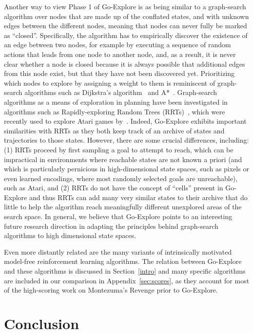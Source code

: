 \documentclass{article}
\begin{document}
Another way to view Phase 1 of Go-Explore is as being similar to a graph-search algorithm over nodes that are made up of the conflated states, and with unknown edges between the different nodes, meaning that nodes can never fully be marked as ``closed''. Specifically, the algorithm has to empirically discover the existence of an edge between two nodes, for example by executing a sequence of random actions that leads from one node to another node, and, as a result, it is never clear whether a node is closed because it is always possible that additional edges from this node exist, but that they have not been discovered yet. Prioritizing which nodes to explore by assigning a weight to them is reminiscent of graph-search algorithms such as Dijkstra's algorithm~\cite{Dijkstra:1959:NTP:2722880.2722945} and A*~\cite{Hart:astar}. Graph-search algorithms as a means of exploration in planning have been investigated in algorithms such as Rapidly-exploring Random Trees (RRTs)~\cite{LaValle1998RapidlyExploringRT}, which were recently used to explore Atari games by~\citet{zhan2018taking}. Indeed, Go-Explore exhibits important similarities with RRTs as they both keep track of an archive of states and trajectories to those states. However, there are some crucial differences, including: (1) RRTs proceed by first sampling a goal to attempt to reach, which can be impractical in environments where reachable states are not known a priori (and which is particularly pernicious in high-dimensional state spaces, such as pixels or even learned encodings, where most randomly selected goals are unreachable), such as Atari, and (2) RRTs do not have the concept of ``cells'' present in Go-Explore and thus RRTs can add many very similar states to their archive that do little to help the algorithm reach meaningfully different unexplored areas of the search space.
In general, we believe that Go-Explore points to an interesting future research direction in adapting the principles behind graph-search algorithms to high dimensional state spaces.

Even more distantly related are the many variants of intrinsically motivated model-free reinforcement learning algorithms. The relation between Go-Explore and these algorithms is discussed in Section~\ref{intro} and many specific algorithms are included in our comparison in Appendix~\ref{sec:scores}, as they account for most of the high-scoring work on Montezuma's Revenge prior to Go-Explore.

\section{Conclusion}
\end{document}
